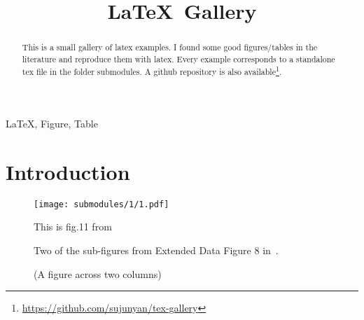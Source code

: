 \documentclass[conference]{IEEEtran}
\title{\LaTeX\, Gallery}
\author{
    \IEEEauthorblockN{Junyan Su}
    \IEEEauthorblockA{junyan.su@my.cityu.edu.hk}
}
\begin{document}
\maketitle

\begin{abstract}
    This is a small gallery of latex examples. I found some good figures/tables in the literature and reproduce them with latex. Every example corresponds to a standalone tex file in the folder submodules. A github repository is also available\footnote{\url{https://github.com/sujunyan/tex-gallery}}.
\end{abstract}


\begin{IEEEkeywords}
    \LaTeX , Figure, Table
\end{IEEEkeywords}

\section{Introduction}
\lipsum[4]

\begin{figure}[b]
    \begin{center}
        \texttt{[image: submodules/1/1.pdf]}
    \end{center} 
    \caption{This is fig.11 from~\cite{1}}
\end{figure}

\lipsum
\begin{figure}[tb]
    \begin{center}
    \end{center} 
    \caption{Two of the sub-figures from Extended Data Figure 8 in~\cite{2}.}
\end{figure}

\begin{figure*}[htb]
    \begin{center}
        \subfigure[A subcaption]{
            
        }
        \subfigure[A subcaption]{
            
        }
    \end{center} 
    \caption{(A figure across two columns)}
\end{figure*}
\end{document}
